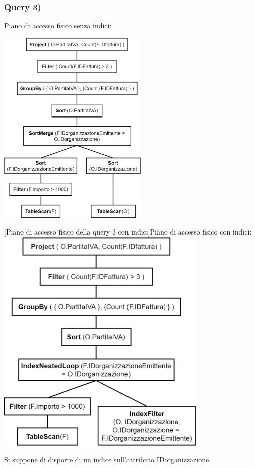 \documentclass[a4paper,12pt]{article}
\begin{document}
 \subsubsection{ Query 3) }

\vspace{-0.3cm}\hspace{-1cm}
\begin{minipage}{\textwidth}
\begin{multicols}{2}

\null \vfill
Piano di accesso fisico senza indici:

\vspace{0.3cm}\includegraphics[height=9.5cm]{ Albero fisico 3.png }
\vfill \null

\columnbreak

 [Piano di accesso fisico della query 3 con indici]{Piano di accesso fisico con indici:}
\includegraphics[height=11cm]{ Albero fisico indici 3.png }

Si suppone di disporre di un indice sull'attributo IDorganizzazione.

\end{multicols}
\end{minipage}
\end{document}
